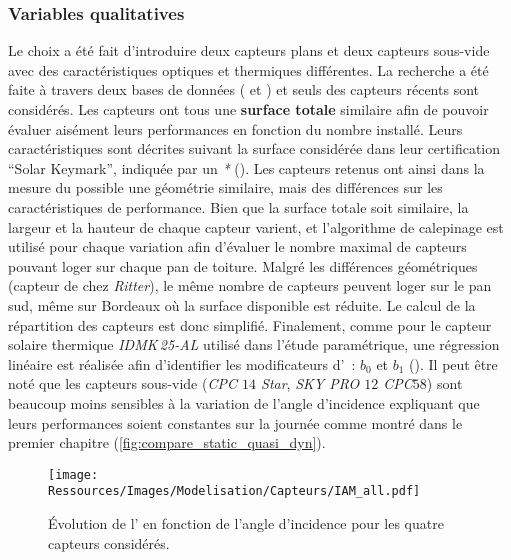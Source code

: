 \subsubsection{Variables qualitatives} %
\label{ssub:variables_qualitatives}
Le choix a été fait d’introduire deux capteurs plans et deux capteurs sous-vide avec
des caractéristiques optiques et thermiques différentes. La recherche a été faite
à travers deux bases de données ( et
) et seuls des capteurs récents sont considérés.
Les capteurs ont tous une \textbf{surface totale} similaire afin de pouvoir évaluer
aisément leurs performances en fonction du nombre installé. Leurs caractéristiques
sont décrites suivant la surface considérée dans leur certification \enquote{Solar Keymark},
indiquée par un \emph{*} (). Les capteurs
retenus ont ainsi dans la mesure du possible une géométrie similaire, mais des différences
sur les caractéristiques de performance. Bien que
la surface totale soit similaire, la largeur et la hauteur de chaque capteur varient, et
l’algorithme de calepinage est utilisé pour chaque variation afin d’évaluer le
nombre maximal de capteurs pouvant loger sur chaque pan de toiture. Malgré les différences géométriques
(capteur de chez \textit{Ritter}), le même nombre de capteurs peuvent loger sur le pan sud,
même sur Bordeaux où la surface disponible
est réduite. Le calcul de la répartition des capteurs  est donc simplifié.
Finalement, comme pour le capteur solaire thermique \textit{IDMK\,25-AL} utilisé dans
l’étude paramétrique, une régression linéaire est réalisée afin d’identifier les
modificateurs d’~: $b_{0}$ et $b_{1}$ (). Il peut
être noté que les capteurs sous-vide (\textit{CPC $14$ Star}, \textit{SKY PRO $12$ CPC$58$})
sont beaucoup moins sensibles à la variation de l’angle d’incidence expliquant que
leurs performances soient constantes sur la journée comme montré dans le premier chapitre
(\ref{fig:compare_static_quasi_dyn}).

\begin{figure}
    \centering
    \texttt{[image: Ressources/Images/Modelisation/Capteurs/IAM\_all.pdf]}
    \caption[Évolution de l’ en fonction de l’angle d’incidence]
    {Évolution de l’ en fonction de l’angle d’incidence pour les quatre capteurs considérés.}
    \label{fig:correlation_IAM_all}
\end{figure}

